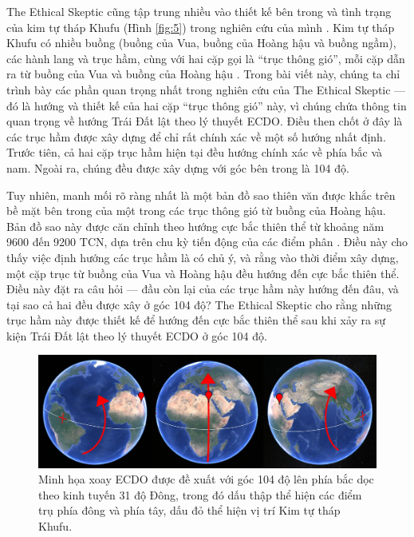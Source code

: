 \documentclass[10pt,twocolumn,letterpaper]{article}
\begin{document}
The Ethical Skeptic cũng tập trung nhiều vào thiết kế bên trong và tình trạng của kim tự tháp Khufu (Hình \ref{fig:5}) trong nghiên cứu của mình \cite{28}. Kim tự tháp Khufu có nhiều buồng (buồng của Vua, buồng của Hoàng hậu và buồng ngầm), các hành lang và trục hầm, cùng với hai cặp gọi là “trục thông gió”, mỗi cặp dẫn ra từ buồng của Vua và buồng của Hoàng hậu \cite{29,30}. Trong bài viết này, chúng ta chỉ trình bày các phần quan trọng nhất trong nghiên cứu của The Ethical Skeptic — đó là hướng và thiết kế của hai cặp “trục thông gió” này, vì chúng chứa thông tin quan trọng về hướng Trái Đất lật theo lý thuyết ECDO.
Điều then chốt ở đây là các trục hầm được xây dựng để chỉ rất chính xác về một số hướng nhất định. Trước tiên, cả hai cặp trục hầm hiện tại đều hướng chính xác về phía bắc và nam. Ngoài ra, chúng đều được xây dựng với góc bên trong là 104 độ.

Tuy nhiên, manh mối rõ ràng nhất là một bản đồ sao thiên văn được khắc trên bề mặt bên trong của một trong các trục thông gió từ buồng của Hoàng hậu. Bản đồ sao này được căn chỉnh theo hướng cực bắc thiên thể từ khoảng năm 9600 đến 9200 TCN, dựa trên chu kỳ tiến động của các điểm phân \cite{28}. Điều này cho thấy việc định hướng các trục hầm là có chủ ý, và rằng vào thời điểm xây dựng, một cặp trục từ buồng của Vua và Hoàng hậu đều hướng đến cực bắc thiên thể. Điều này đặt ra câu hỏi — đầu còn lại của các trục hầm này hướng đến đâu, và tại sao cả hai đều được xây ở góc 104 độ? The Ethical Skeptic cho rằng những trục hầm này được thiết kế để hướng đến cực bắc thiên thể sau khi xảy ra sự kiện Trái Đất lật theo lý thuyết ECDO ở góc 104 độ.

\begin{figure}[t]
\begin{center}
\includegraphics[width=1\textwidth]{drawing.jpg}
\end{center}
   \caption{Minh họa xoay ECDO được đề xuất với góc 104 độ lên phía bắc dọc theo kinh tuyến 31 độ Đông, trong đó dấu thập thể hiện các điểm trụ phía đông và phía tây, dấu đỏ thể hiện vị trí Kim tự tháp Khufu.}
\label{fig:6}
\end{figure}
\end{document}
